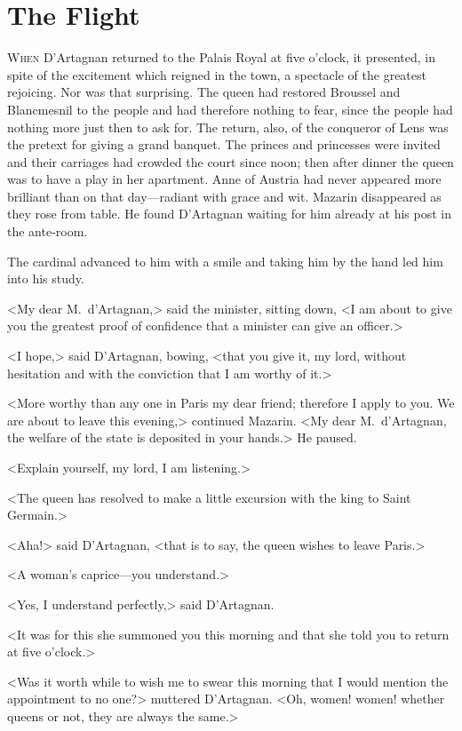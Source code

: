 \chapter{The Flight}

 \lettrine{W}{hen} D'Artagnan returned to the Palais Royal at five o'clock, it presented, in spite of the excitement which reigned in the town, a spectacle of the greatest rejoicing. Nor was that surprising. The queen had restored Broussel and Blancmesnil to the people and had therefore nothing to fear, since the people had nothing more just then to ask for. The return, also, of the conqueror of Lens was the pretext for giving a grand banquet. The princes and princesses were invited and their carriages had crowded the court since noon; then after dinner the queen was to have a play in her apartment. Anne of Austria had never appeared more brilliant than on that day—radiant with grace and wit. Mazarin disappeared as they rose from table. He found D'Artagnan waiting for him already at his post in the ante-room.

The cardinal advanced to him with a smile and taking him by the hand led him into his study.

<My dear M.~d'Artagnan,> said the minister, sitting down, <I am about to give you the greatest proof of confidence that a minister can give an officer.>

<I hope,> said D'Artagnan, bowing, <that you give it, my lord, without hesitation and with the conviction that I am worthy of it.>

<More worthy than any one in Paris my dear friend; therefore I apply to you. We are about to leave this evening,> continued Mazarin. <My dear M.~d'Artagnan, the welfare of the state is deposited in your hands.> He paused.

<Explain yourself, my lord, I am listening.>

<The queen has resolved to make a little excursion with the king to Saint Germain.>

<Aha!> said D'Artagnan, <that is to say, the queen wishes to leave Paris.>

<A woman's caprice—you understand.>

<Yes, I understand perfectly,> said D'Artagnan.

<It was for this she summoned you this morning and that she told you to return at five o'clock.>

<Was it worth while to wish me to swear this morning that I would mention the appointment to no one?> muttered D'Artagnan. <Oh, women! women! whether queens or not, they are always the same.>


